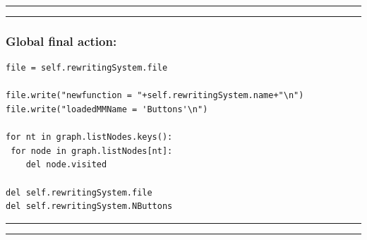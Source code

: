 \documentclass{article}
\begin{document}
\hrule \vspace{6pt}
\hrule \vspace{6pt}
\subsubsection*{Global final action: }
\begin{small}\begin{verbatim}
file = self.rewritingSystem.file

file.write("newfunction = "+self.rewritingSystem.name+"\n")
file.write("loadedMMName = 'Buttons'\n")

for nt in graph.listNodes.keys():
 for node in graph.listNodes[nt]:
    del node.visited     

del self.rewritingSystem.file
del self.rewritingSystem.NButtons
\end{verbatim}\end{small}

\hrule \vspace{6pt}
\hrule \vspace{6pt}
\end{document}
